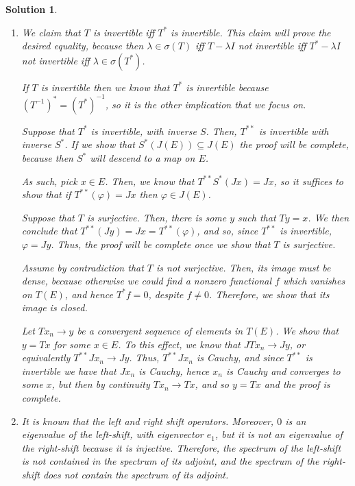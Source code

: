 \documentclass{article}
\theoremstyle{nonumberplain}
\newtheorem{sol}{Solution}
\begin{document}
\begin{sol}
\leavevmode
\begin{enumerate}
\item We claim that $T$ is invertible iff $T^*$ is invertible. This claim will prove the desired equality, because then $\lambda \in \sigma(T)$ iff $T-\lambda I$ not invertible iff $T^* - \lambda I$ not invertible iff $\lambda \in \sigma(T^*)$.

If $T$ is invertible then we know that $T^*$ is invertible because $(T^{-1})^* = (T^*)^{-1}$, so it is the other implication that we focus on.

Suppose that $T^*$ is invertible, with inverse $S$. Then, $T^{**}$ is invertible with inverse $S^*$. If we show that $S^*(J(E)) \subseteq J(E)$ the proof will be complete, because then $S^*$ will descend to a map on $E$.

As such, pick $x \in E$. Then, we know that $T^{**}S^*(Jx) = Jx$, so it suffices to show that if $T^{**}(\varphi) = Jx$ then $\varphi \in J(E)$.

Suppose that $T$ is surjective. Then, there is some $y$ such that $Ty = x$. We then conclude that $T^{**}(Jy) = Jx = T^{**}(\varphi)$, and so, since $T^{**}$ is invertible, $\varphi = Jy$. Thus, the proof will be complete once we show that $T$ is surjective.

Assume by contradiction that $T$ is not surjective. Then, its image must be dense, because otherwise we could find a nonzero functional $f$ which vanishes on $T(E)$, and hence $T^* f = 0$, despite $f \neq 0$. Therefore, we show that its image is closed.

Let $Tx_n \to y$ be a convergent sequence of elements in $T(E)$. We show that $y = Tx$ for some $x \in E$. To this effect, we know that $JTx_n \to Jy$, or equivalently $T^{**}Jx_n \to Jy$. Thus, $T^{**} Jx_n$ is Cauchy, and since $T^{**}$ is invertible we have that $Jx_n$ is Cauchy, hence $x_n$ is Cauchy and converges to some $x$, but then by continuity $Tx_n \to Tx$, and so $y = Tx$ and the proof is complete.

\item It is known that the left and right shift operators. Moreover, $0$ is an eigenvalue of the left-shift, with eigenvector $e_1$, but it is not an eigenvalue of the right-shift because it is injective. Therefore, the spectrum of the left-shift is not contained in the spectrum of its adjoint, and the spectrum of the right-shift does not contain the spectrum of its adjoint.
\end{enumerate}
\end{sol}
\end{document}
